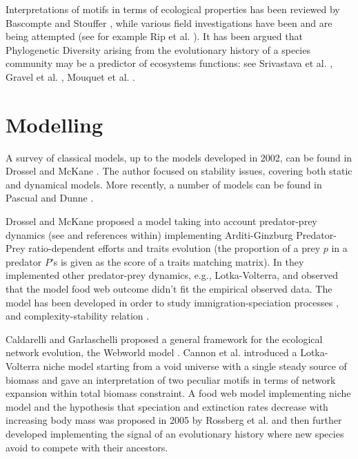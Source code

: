 \documentclass[12pt,a4paper]{report}
\begin{document}
Interpretations of motifs in terms of ecological properties has been reviewed by Bascompte and Stouffer \cite{bascompte_assembly_2009}, while various field investigations have been and are being attempted (see for example Rip et al. \cite{rip_experimental_2010}). It has been argued that Phylogenetic Diversity arising from the evolutionary history of a species community may be a predictor of ecosystems functions: see  Srivastava et al. \cite{srivastava_phylogenetic_2012}, Gravel et al. \cite{gravel2010experimental}, Mouquet et al. \cite{mouquet2012ecophylogenetics}.

\section{Modelling}
A survey of classical models, up to the models developed in 2002, can be found in Drossel and McKane \cite{drossel_modelling_2002}. The author focused on stability issues, covering both static and dynamical models. More recently, a number of models can be found in Pascual and Dunne \cite{pascual_ecological_2005}.

Drossel and McKane proposed a model taking into account predator-prey dynamics (see \cite{drossel_influence_2000, mckane_models_2005} and references within) implementing Arditi-Ginzburg Predator-Prey ratio-dependent efforts \cite{arditi_coupling_1989} and traits evolution (the proportion of a prey $p$ in a predator $P$'s is given as the score of a traits matching matrix). In \cite{quince_topological_2005} they implemented other predator-prey dynamics, e.g., Lotka-Volterra, and observed that the model food web outcome didn't fit the empirical observed data. The model has been developed in order to study immigration-speciation processes \cite{powell_comparison_2009}, and complexity-stability relation \cite{plitzko_complexitystability_2012}.

Caldarelli and Garlaschelli proposed a general framework for the ecological network evolution, the Webworld model \cite{caldarelli_modelling_1998}. Cannon et al. introduced a Lotka-Volterra niche model starting from a void universe with a single steady source of biomass \cite{cannon_diversification_2010} and gave an interpretation of two peculiar motifs in terms of network expansion within total biomass constraint. A food web model implementing niche model and the hypothesis that speciation and extinction rates decrease with increasing body mass was proposed in 2005 by Rossberg et al. \cite{rossberg_explanatory_2005} and then further developed \cite{rossberg_food_2006} implementing the signal of an evolutionary history where new species avoid to compete with their ancestors.
\end{document}
